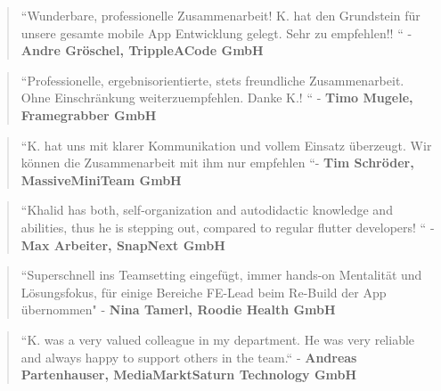 \documentclass[10pt,a4paper,normalphoto]{altacv}
\begin{document}
\begin{fullwidth}
\begin{quote}
``Wunderbare, professionelle Zusammenarbeit! K. hat den Grundstein für unsere gesamte mobile App Entwicklung gelegt. Sehr zu empfehlen!! `` - \textbf{Andre Gröschel, TrippleACode GmbH}\\
\end{quote}
\vspace{.5em}
\begin{quote}
``Professionelle, ergebnisorientierte, stets freundliche Zusammenarbeit. Ohne Einschränkung weiterzuempfehlen. Danke K.! `` - \textbf{Timo Mugele, Framegrabber GmbH}\\
\end{quote}

\vspace{.5em}

\begin{quote}
``K. hat uns mit klarer Kommunikation und vollem Einsatz überzeugt. Wir können die Zusammenarbeit mit ihm nur empfehlen ``- \textbf{Tim Schröder, MassiveMiniTeam GmbH}\\
\end{quote}

\vspace{.5em}
\begin{quote}
``Khalid has both, self-organization and autodidactic knowledge and abilities, thus he is stepping out, compared to regular flutter developers! `` - \textbf{Max Arbeiter, SnapNext GmbH}\\
\end{quote}

\vspace{.5em}    
\begin{quote}
``Superschnell ins Teamsetting eingefügt, immer hands-on Mentalität und Lösungsfokus, für einige Bereiche FE-Lead beim Re-Build der App übernommen" - \textbf{Nina Tamerl, Roodie Health GmbH}\\
\end{quote}

\vspace{.5em}
\begin{quote}
``K. was a very valued colleague in my department. He was very reliable and always happy to support others in the team.`` - \textbf{Andreas Partenhauser, MediaMarktSaturn Technology GmbH}\\
\end{quote}



\end{fullwidth}
\end{document}
